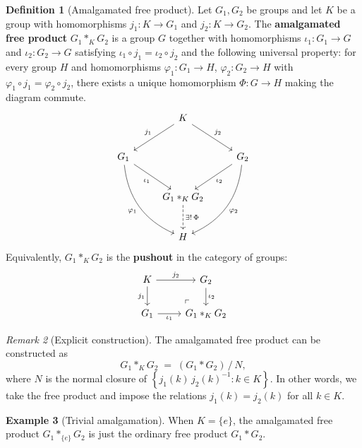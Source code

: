 \documentclass[12pt,a4paper,openany]{book}
\theoremstyle{definition}
\newtheorem{definition}{Definition}[chapter]
\newtheorem{example}[definition]{Example}
\theoremstyle{plain}
\theoremstyle{remark}
\newtheorem{remark}[definition]{Remark}
\newcommand{\set}[1]{\left\{#1\right\}}
\begin{document}
\begin{definition}[Amalgamated free product]\label{def:amalgamated-free-product}
  Let $G_1, G_2$ be groups and let $K$ be a group with homomorphisms
  $j_1\colon K \to G_1$ and $j_2\colon K \to G_2$.  The \textbf{amalgamated
  free product} $G_1 *_K G_2$ is a group $G$ together with homomorphisms
  $\iota_1\colon G_1 \to G$ and $\iota_2\colon G_2 \to G$ satisfying
  $\iota_1 \circ j_1 = \iota_2 \circ j_2$ and the following universal
  property: for every group $H$ and homomorphisms $\varphi_1\colon G_1 \to H$,
  $\varphi_2\colon G_2 \to H$ with $\varphi_1 \circ j_1 = \varphi_2 \circ
  j_2$, there exists a unique homomorphism $\Phi\colon G \to H$ making the
  diagram commute.
  \[
    \begin{tikzcd}[column sep=2.5em, row sep=2.5em]
      & K \ar[dl,"j_1"'] \ar[dr,"j_2"] & \\
      G_1 \ar[dr,"\iota_1"'] \ar[ddr,bend right,"\varphi_1"'] & &
      G_2 \ar[dl,"\iota_2"] \ar[ddl,bend left,"\varphi_2"] \\
      & G_1 *_K G_2 \ar[d,dashed,"\exists!\,\Phi"] & \\
      & H &
    \end{tikzcd}
  \]
  Equivalently, $G_1 *_K G_2$ is the \textbf{pushout}
  in the category of groups:
  \[
    \begin{tikzcd}
      K \ar[r,"j_2"] \ar[d,"j_1"'] & G_2 \ar[d,"\iota_2"] \\
      G_1 \ar[r,"\iota_1"'] & G_1 *_K G_2 \ar[ul, phantom, "\ulcorner" very near start]
    \end{tikzcd}
  \]
\end{definition}

\begin{remark}[Explicit construction]\label{rem:amalgamated-explicit}
  The amalgamated free product can be constructed as
  \[
    G_1 *_K G_2 \;=\; (G_1 * G_2) \,\big/\, N,
  \]
  where $N$ is the normal closure of $\set{j_1(k)\, j_2(k)^{-1} : k \in K}$.
  In other words, we take the free product and impose the relations
  $j_1(k) = j_2(k)$ for all $k \in K$.
\end{remark}

\begin{example}[Trivial amalgamation]\label{ex:trivial-amalgamation}
  When $K = \{e\}$, the amalgamated free product $G_1 *_{\{e\}} G_2$ is just the
  ordinary free product $G_1 * G_2$.
\end{example}
\end{document}
